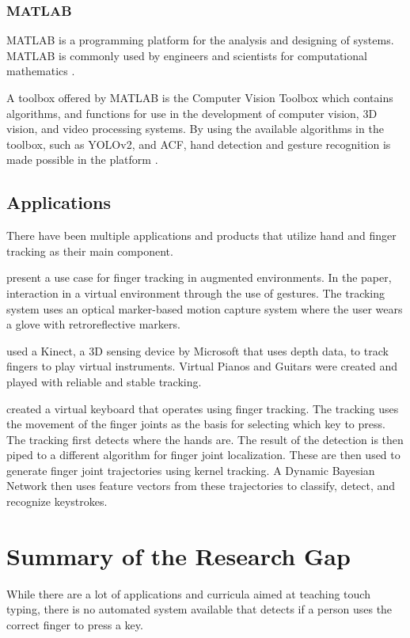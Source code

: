 \documentclass{report}
\begin{document}
\subsubsection{MATLAB}
MATLAB is a programming platform for the analysis and designing of systems.
MATLAB is commonly used by engineers and scientists for computational
mathematics \parencite{what-matlab}.

A toolbox offered by MATLAB is the Computer Vision Toolbox which contains
algorithms, and functions for use in the development of computer vision, 3D
vision, and video processing systems. By using the available algorithms in the
toolbox, such as YOLOv2, and ACF, hand detection and gesture recognition is made
possible in the platform \parencite{matlab}.

\subsection{Applications}

There have been multiple applications and products that utilize hand and finger
tracking as their main component.

\textcite{dorf2001} present a use case for finger tracking in augmented
environments. In the paper, interaction in a virtual environment through the use
of gestures. The tracking system uses an optical marker-based motion capture
system where the user wears a glove with retroreflective markers.

\textcite{chiang2014} used a Kinect, a 3D sensing device by Microsoft that
uses depth data, to track fingers to play virtual instruments. Virtual Pianos
and Guitars were created and played with reliable and stable tracking.

\textcite{yousaf2014} created a virtual keyboard that operates using finger
tracking. The tracking uses the movement of the finger joints as the basis for
selecting which key to press. The tracking first detects where the hands are.
The result of the detection is then piped to a different algorithm for finger
joint localization. These are then used to generate finger joint trajectories
using kernel tracking. A Dynamic Bayesian Network then uses feature vectors from
these trajectories to classify, detect, and recognize keystrokes.

\section{Summary of the Research Gap}
While there are a lot of applications and curricula aimed at teaching touch
typing, there is no automated system available that detects if a person uses the
correct finger to press a key.
\end{document}
